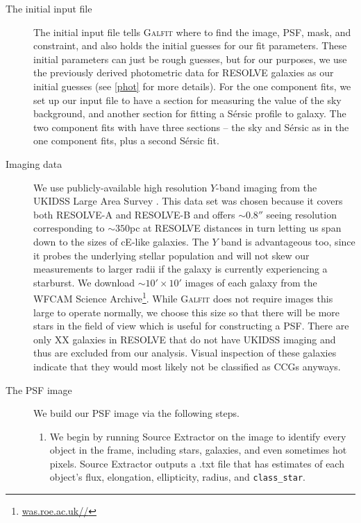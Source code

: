 \documentclass[iop,apj,twocolappendix]{emulateapj}
\begin{document}
\begin{description}

\item[The initial input file]{The initial input file tells \textsc{Galfit} where to find the image, PSF, mask, and constraint, and also holds the initial guesses for our fit parameters. These initial parameters can just be rough guesses, but for our purposes, we use the previously derived photometric data for RESOLVE galaxies as our initial guesses (see \autoref{phot} for more details). For the one component fits, we set up our input file to have a section for measuring the value of the sky background, and another section for fitting a S\'ersic profile to galaxy. The two component fits with have three sections -- the sky and S\'ersic as in the one component fits, plus a second S\'ersic fit. }

\item[Imaging data]{We use publicly-available high resolution $Y$-band imaging from the UKIDSS Large Area Survey \citep{Lawrence2007}. This data set was chosen because it covers both RESOLVE-A and RESOLVE-B and offers $\sim0.8''$ seeing resolution corresponding to $\sim350$pc at RESOLVE distances in turn letting us span down to the sizes of cE-like galaxies. The $Y$ band is advantageous too, since it probes the underlying stellar population and will not skew our measurements to larger radii if the galaxy is currently experiencing a starburst. We download $\sim10'\times10'$ images of each galaxy from the WFCAM Science Archive\footnote{\url{was.roe.ac.uk//}}}. While \textsc{Galfit} does not require images this large to operate normally, we choose this size so that there will be more stars in the field of view which is useful for constructing a PSF. There are  only XX galaxies in RESOLVE that do not have UKIDSS imaging and thus are excluded from our analysis. Visual inspection of these galaxies indicate that they would most likely not be classified as CCGs anyways.

\item[The PSF image]{We build our PSF image via the following steps.
\begin{enumerate}

\item We begin by running Source Extractor on the image to identify every object in the frame, including stars, galaxies, and even sometimes hot pixels. Source Extractor outputs a .txt file that has estimates of each object's flux, elongation, ellipticity, radius, and \texttt{class\_star}.


\end{enumerate}}
\end{description}
\end{document}
